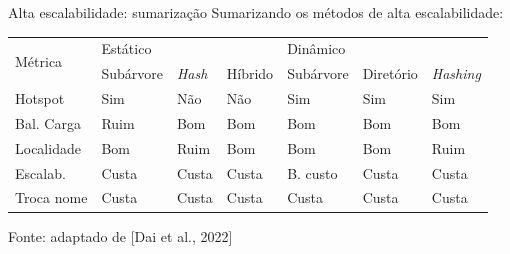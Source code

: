 \documentclass[xcolor=dvipsnames,table]{beamer}
\begin{document}

\begin{frame}{Alta escalabilidade: sumarização}
	Sumarizando os métodos de alta escalabilidade:
\begin{table}[]
\begin{tabular}{|l|lll|lll|}
\hline
\multirow{2}{*}{Métrica} & \multicolumn{3}{l|}{Estático}                                                 & \multicolumn{3}{l|}{Dinâmico}                                                      \\ \cline{2-7} 
                         & \multicolumn{1}{l|}{Subárvore} & \multicolumn{1}{l|}{\textit{Hash}} & Híbrido & \multicolumn{1}{l|}{Subárvore} & \multicolumn{1}{l|}{Diretório} & \textit{Hashing} \\ \hline
Hotspot                  & \multicolumn{1}{l|}{Sim}       & \multicolumn{1}{l|}{Não}           & Não     & \multicolumn{1}{l|}{Sim}       & \multicolumn{1}{l|}{Sim}       & Sim              \\ \hline
Bal. Carga                    & \multicolumn{1}{l|}{Ruim}      & \multicolumn{1}{l|}{Bom}           & Bom     & \multicolumn{1}{l|}{Bom}       & \multicolumn{1}{l|}{Bom}       & Bom              \\ \hline
Localidade               & \multicolumn{1}{l|}{Bom}       & \multicolumn{1}{l|}{Ruim}          & Bom     & \multicolumn{1}{l|}{Bom}       & \multicolumn{1}{l|}{Bom}       & Ruim             \\ \hline
Escalab.                 & \multicolumn{1}{l|}{Custa}     & \multicolumn{1}{l|}{Custa}         & Custa   & \multicolumn{1}{l|}{B. custo}  & \multicolumn{1}{l|}{Custa}     & Custa            \\ \hline
Troca nome               & \multicolumn{1}{l|}{Custa}     & \multicolumn{1}{l|}{Custa}         & Custa   & \multicolumn{1}{l|}{Custa}     & \multicolumn{1}{l|}{Custa}     & Custa            \\ \hline
\end{tabular}
\end{table}
Fonte: adaptado de [Dai et al., 2022]
\end{frame}
\end{document}
